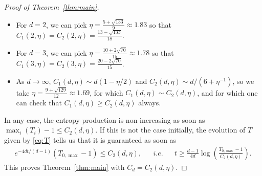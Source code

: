 \documentclass[11pt,a4paper]{article}
\theoremstyle{definition}
\theoremstyle{plain}
\begin{document}
\begin{proof}[Proof of Theorem~\ref{thm:main}]
\begin{itemize}
    \item For $d=2$, we can pick $\eta=\frac{5+\sqrt{133}}{9}\approx 1.83$ so that $C_1(2,\eta)=C_2(2,\eta)=\frac{13-\sqrt{133}}{18}$. 
    \item For $d=3$, we can pick
$\eta=\frac{10+2\sqrt{70}}{15}\approx 1.78$ so that $C_1(3,\eta)=C_2(3,\eta)=\frac{20-2\sqrt{70}}{15}$.
    \item As $d\rightarrow \infty$, $C_1(d,\eta) \sim d(1-\eta/2) $ and $C_2(d,\eta) \sim d/(6+\eta^{-1}) $, so we take $\eta=\frac{9+\sqrt{129}}{12}\approx 1.69$, for which $C_1(d,\eta)\sim C_2(d,\eta)$, and for which one can check that $C_1(d,\eta)\geq C_2(d,\eta)$ always.
\end{itemize}
In any case, the entropy production is non-increasing as soon as $\max_i(T_i)-1\leq C_2(d,\eta)$. If this is not the case initially, the evolution of $T$ given by \eqref{eq:T} tells us that it is guaranteed as soon as
\begin{align*}
    e^{-4dt/(d-1)}(T_{0,\max}-1)\leq C_2(d,\eta), && \textit{i.e.} && t\geq \frac{d-1}{4d}\log\left(\frac{T_{0,\max}-1}{C_2(d,\eta)}\right).
\end{align*}
This proves Theorem~\ref{thm:main} with $C_d=C_2(d,\eta)$.
\end{proof}
\end{document}
